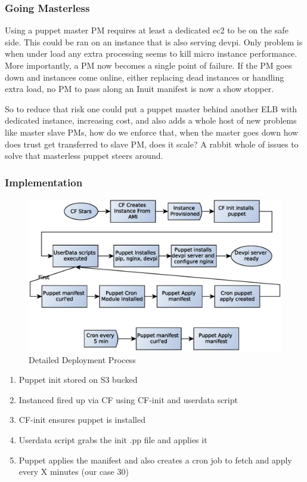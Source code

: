 \documentclass[12pt, letterpaper]{article}
\begin{document}
\subsubsection{Going Masterless}

Using a puppet master PM requires at least a dedicated ec2 to be on the safe side. This could be ran on an instance
that is also serving devpi. Only problem is when under load any extra processing seems to kill micro instance performance.
More importantly, a PM now becomes a single point of failure. If the PM goes down and instances
come online, either replacing dead instances or handling extra load, no PM to pass along an Inuit manifest is now a show stopper.

So to reduce that risk one could put a puppet master behind another ELB with dedicated instance, increasing cost, and also adds 
a whole host of new problems like master slave PMs, how do we enforce that, when the master goes down how does trust get 
transferred to slave PM, does it scale? A rabbit whole of issues to solve that masterless puppet steers around.

\subsubsection{Implementation}

\begin{figure}[h]
    \caption{Detailed Deployment Process}
    \centering
    \includegraphics[width=\textwidth]{figures/base_setup.eps}
\end{figure}
\begin{enumerate}
    \item Puppet init stored on S3 bucked
    \item Instanced fired up via CF using CF-init and userdata script
    \item CF-init ensures puppet is installed
    \item Userdata script grabs the init .pp file and applies it
    \item Puppet applies the manifest and also creates a cron job to fetch and apply every X minutes (our case 30) 
\end{enumerate}
\end{document}
